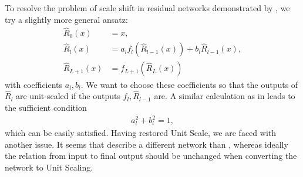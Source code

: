 To resolve the problem of scale shift in residual networks demonstrated by , we try a slightly more general ansatz:
\begin{align}
    \hat{R}_0(x) &= x,  \label{eq:general_resnet_a}
    \\
    \hat{R}_{l}(x) &= a_l f_l(\hat{R}_{l-1}(x)) + b_l\hat{R}_{l-1}(x),  \label{eq:general_resnet_b}
    \\
    \hat{R}_{L+1}(x) &= f_{L+1}(\hat{R}_L(x)) \label{eq:general_resnet_c}
\end{align}
with coefficients $a_l, b_l$. We want to choose these coefficients so that the outputs of $\hat{R}_{l}$ are unit-scaled if the outputs $f_l, \hat{R}_{l-1}$ are. A similar calculation as in  leads to the sufficient condition
\begin{align}
    a_l^2 + b_l^2 = 1, \label{eq:a_b_sq_sum}
\end{align}
which can be easily satisfied. Having restored Unit Scale, we are faced with another issue. It seems that  describe a different network than , whereas ideally the relation from input to final output should be unchanged when converting the network to Unit Scaling. 

